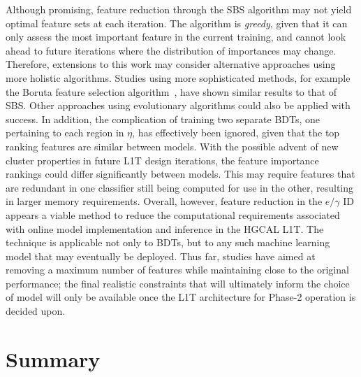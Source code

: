 Although promising, feature reduction through the SBS algorithm may not yield optimal feature sets at each iteration. The algorithm is \textit{greedy}, given that it can only assess the most important feature in the current training, and cannot look ahead to future iterations where the distribution of importances may change. Therefore, extensions to this work may consider alternative approaches using more holistic algorithms. Studies using more sophisticated methods, for example the Boruta feature selection algorithm~\cite{Boruta}, have shown similar results to that of SBS. Other approaches using evolutionary algorithms could also be applied with success. In addition, the complication of training two separate BDTs, one pertaining to each region in $\eta$, has effectively been ignored, given that the top ranking features are similar between models. With the possible advent of new cluster properties in future L1T design iterations, the feature importance rankings could differ significantly between models. This may require features that are redundant in one classifier still being computed for use in the other, resulting in larger memory requirements. Overall, however, feature reduction in the $e/\gamma$ ID appears a viable method to reduce the computational requirements associated with online model implementation and inference in the HGCAL L1T. The technique is applicable not only to BDTs, but to any such machine learning model that may eventually be deployed. Thus far, studies have aimed at removing a maximum number of features while maintaining close to the original performance; the final realistic constraints that will ultimately inform the choice of model will only be available once the L1T architecture for Phase-2 operation is decided upon. 

\section{Summary}

